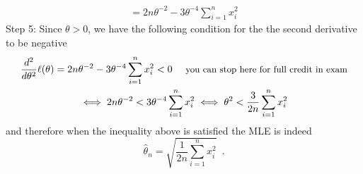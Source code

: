 \begin{Answer}
\begin{enumerate}
\begin{multline*}
=   2n \theta^{-2} -3 \theta^{-4} \sum_{i=1}^n  x_i^2 
\end{multline*}
{\sf Step 5:}
Since $\theta > 0$, we have the following condition for the the second derivative to be negative 
\begin{multline*}
\frac{d^2}{d \theta^2} \ell(\theta)= 2n \theta^{-2} -3 \theta^{-4} \sum_{i=1}^n  x_i^2 <0 \quad {\text{ \small you can stop here for full credit in exam}}\\
\iff
2n \theta^{-2} < 3 \theta^{-4} \sum_{i=1}^n  x_i^2
\iff \theta^{2} < \frac{3}{2n}  \sum_{i=1}^n  x_i^2
\end{multline*}
and therefore when the inequality above is satisfied the MLE is indeed
$$\widehat{\theta}_n = \sqrt{  \frac{1}{2n} \sum_{i=1}^n x_i^2 } \enspace.$$
\end{enumerate}

\end{Answer}



